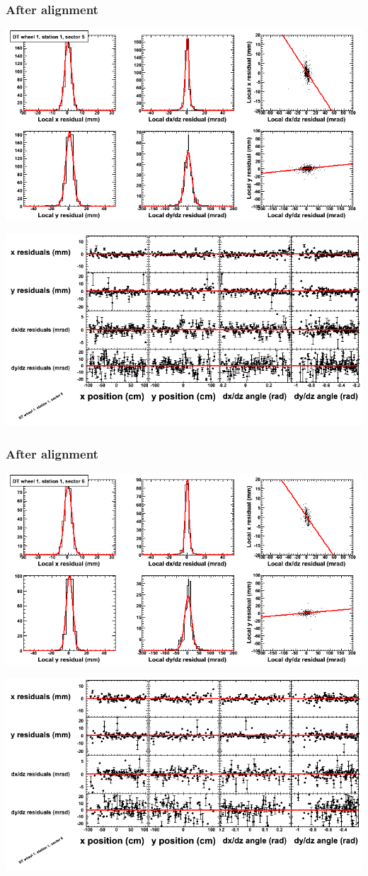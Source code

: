 \documentclass[compress]{beamer}
\begin{document}
\begin{frame}
\frametitle{After alignment}
\includegraphics[width=0.7\linewidth]{NOV4_fitfunctions/MBwhDst1sec05_bellcurves.png}

\includegraphics[width=0.7\linewidth]{NOV4_fitfunctions/MBwhDst1sec05_polynomials.png}
\end{frame}

\begin{frame}
\frametitle{After alignment}
\includegraphics[width=0.7\linewidth]{NOV4_fitfunctions/MBwhDst1sec06_bellcurves.png}

\includegraphics[width=0.7\linewidth]{NOV4_fitfunctions/MBwhDst1sec06_polynomials.png}
\end{frame}
\end{document}
